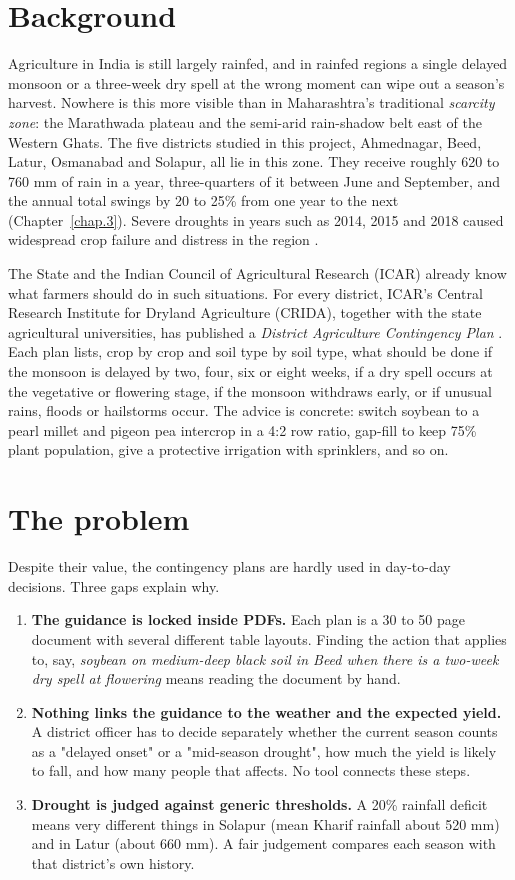 \label{chap.1}
\section{Background}
Agriculture in India is still largely rainfed, and in rainfed regions a single delayed monsoon or a three-week dry spell at the wrong moment can wipe out a season's harvest. Nowhere is this more visible than in Maharashtra's traditional \emph{scarcity zone}: the Marathwada plateau and the semi-arid rain-shadow belt east of the Western Ghats. The five districts studied in this project, Ahmednagar, Beed, Latur, Osmanabad and Solapur, all lie in this zone. They receive roughly 620 to 760 mm of rain in a year, three-quarters of it between June and September, and the annual total swings by 20 to 25\% from one year to the next (Chapter~\ref{chap.3}). Severe droughts in years such as 2014, 2015 and 2018 caused widespread crop failure and distress in the region \cite{udmale2014farmers}.

The State and the Indian Council of Agricultural Research (ICAR) already know what farmers should do in such situations. For every district, ICAR's Central Research Institute for Dryland Agriculture (CRIDA), together with the state agricultural universities, has published a \emph{District Agriculture Contingency Plan} \cite{crida2011plans}. Each plan lists, crop by crop and soil type by soil type, what should be done if the monsoon is delayed by two, four, six or eight weeks, if a dry spell occurs at the vegetative or flowering stage, if the monsoon withdraws early, or if unusual rains, floods or hailstorms occur. The advice is concrete: switch soybean to a pearl millet and pigeon pea intercrop in a 4:2 row ratio, gap-fill to keep 75\% plant population, give a protective irrigation with sprinklers, and so on.

\section{The problem}
Despite their value, the contingency plans are hardly used in day-to-day decisions. Three gaps explain why.

\begin{enumerate}
	\item \textbf{The guidance is locked inside PDFs.} Each plan is a 30 to 50 page document with several different table layouts. Finding the action that applies to, say, \emph{soybean on medium-deep black soil in Beed when there is a two-week dry spell at flowering} means reading the document by hand.
	\item \textbf{Nothing links the guidance to the weather and the expected yield.} A district officer has to decide separately whether the current season counts as a "delayed onset" or a "mid-season drought", how much the yield is likely to fall, and how many people that affects. No tool connects these steps.
	\item \textbf{Drought is judged against generic thresholds.} A 20\% rainfall deficit means very different things in Solapur (mean Kharif rainfall about 520 mm) and in Latur (about 660 mm). A fair judgement compares each season with that district's own history.
\end{enumerate}

